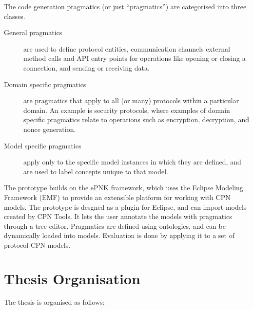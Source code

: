 The code generation pragmatics (or just ``pragmatics'') are categorised
into three classes.
\begin{description}
	\item[General pragmatics] are used to define protocol entities, communication
	channels external method calls and API entry points for operations like opening
	or closing a connection, and sending or receiving data.
	\item[Domain specific pragmatics] are pragmatics that apply to all (or many)
	protocols within a particular domain. An example is security protocols, where
	examples of domain specific pragmatics relate to operations such as
	encryption, decryption, and nonce generation.
	\item[Model specific pragmatics] apply only to the specific model instances in
	which they are defined, and are used to label concepts unique to that model. 
\end{description}

The prototype builds on the ePNK framework,
which uses the Eclipse Modeling Framework (EMF) to provide an extensible
platform for working with CPN models. The prototype is desgned as a plugin for
Eclipse, and can import models created by CPN Tools. It lets the user annotate
the models with pragmatics through a tree editor. Pragmatics are defined using
ontologies, and can be dynamically loaded into models. Evaluation is done by
applying it to a set of protocol CPN models.

\section{Thesis Organisation}

The thesis is organised as follows:

